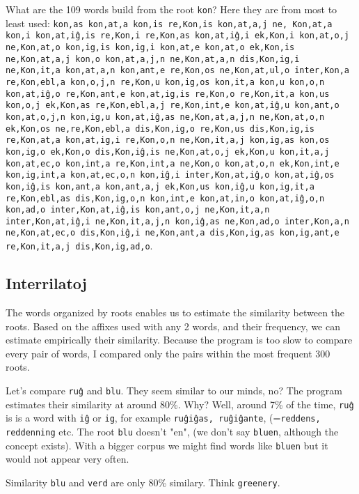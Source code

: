 \documentclass[12pt,twoside]{article}
\begin{document}
What are the 109 words build from the root \texttt{kon}? Here they are from most to least used: \texttt{kon,as kon,at,a kon,is re,Kon,is kon,at,a,j ne,
Kon,at,a kon,i kon,at,iĝ,is re,Kon,i re,Kon,as kon,at,iĝ,i ek,Kon,i kon,at,o,j ne,Kon,at,o kon,ig,is kon,ig,i kon,at,e kon,at,o ek,Kon,is 
ne,Kon,at,a,j kon,o kon,at,a,j,n ne,Kon,at,a,n dis,Kon,ig,i ne,Kon,it,a kon,at,a,n kon,ant,e re,Kon,os ne,Kon,at,ul,o inter,Kon,a 
re,Kon,ebl,a kon,o,j,n re,Kon,u kon,ig,os kon,it,a kon,u kon,o,n kon,at,iĝ,o re,Kon,ant,e kon,at,ig,is re,Kon,o re,Kon,it,a kon,us 
kon,o,j ek,Kon,as re,Kon,ebl,a,j re,Kon,int,e kon,at,iĝ,u kon,ant,o kon,at,o,j,n kon,ig,u kon,at,iĝ,as ne,Kon,at,a,j,n ne,Kon,at,o,n 
ek,Kon,os ne,re,Kon,ebl,a dis,Kon,ig,o re,Kon,us dis,Kon,ig,is re,Kon,at,a kon,at,ig,i re,Kon,o,n ne,Kon,it,a,j kon,ig,as kon,os kon,ig,o 
ek,Kon,o dis,Kon,iĝ,is ne,Kon,at,o,j ek,Kon,u kon,it,a,j kon,at,ec,o kon,int,a re,Kon,int,a ne,Kon,o kon,at,o,n ek,Kon,int,e kon,ig,int,a 
kon,at,ec,o,n kon,iĝ,i inter,Kon,at,iĝ,o kon,at,iĝ,os kon,iĝ,is kon,ant,a kon,ant,a,j ek,Kon,us kon,iĝ,u kon,ig,it,a re,Kon,ebl,as 
dis,Kon,ig,o,n kon,int,e kon,at,in,o kon,at,iĝ,o,n kon,ad,o inter,Kon,at,iĝ,is kon,ant,o,j ne,Kon,it,a,n inter,Kon,at,iĝ,i ne,Kon,it,a,j,n 
kon,iĝ,as ne,Kon,ad,o inter,Kon,a,n ne,Kon,at,ec,o dis,Kon,iĝ,i ne,Kon,ant,a dis,Kon,ig,as kon,ig,ant,e re,Kon,it,a,j dis,Kon,ig,ad,o}.

\subsection{Interrilatoj}

The words organized by roots enables us to estimate the similarity between the roots. Based on the affixes used with any 2 words, and their 
frequency, we can estimate empirically their similarity.
Because the program is too slow to compare every pair of words, I compared only the pairs within the most frequent 300 roots.

Let's compare \texttt{ruĝ} and \texttt{blu}. They seem similar to our minds, no? The program estimates their similarity at around 80\%. 
Why?  Well, around 7\% of the time, \texttt{ruĝ} is is a word with \texttt{iĝ} or \texttt{ig}, for example \texttt{ruĝiĝas, ruĝiĝante}, 
(=\texttt{reddens, reddenning} etc. 
The root \texttt{blu} doesn't "en", (we don't say \texttt{bluen}, although the concept exists). With a bigger corpus we might find words like
\texttt{bluen} but it would not appear very often.

Similarity \texttt{blu} and \texttt{verd} are only 80\% similary. Think \texttt{greenery}.
\end{document}
